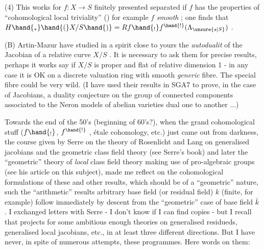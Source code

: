 
(4) This works  for $f : X \to S$ finitely presented separated if $f$ has the
 properties of ``cohomological local triviality''  () for
example $f$ \textit{smooth} ; one finds that $H\hand{_*}\hand{(}X/S\hand{)} = Rf\hand{_!}f^{\hand{!}}(\Lambda_{\unsure{s|S}})$ . \margin{\hand{$*\quad *\quad *$}}

(B) Artin-Mazur have studied in a spirit close to yours the \textit{autodualit} of
the Jacobian of a relative curve $X/S$ . It is necessary to ask them for
precise results, perhaps it works say if $X/S$ is proper and flat of relative
dimension 1 - in any case it is OK on a discrete valuation ring with smooth
\textit{generic} fibre. The special fibre could be very wild. (I have used their
results in SGA7 to prove, in the case of Jacobians, a duality conjecture on
the group of connected components associated to the Neron models of abelian
varieties dual one to another ...)

Towards the end  of the 50's (beginning of 60's?), when the
grand cohomological stuff ($f\hand{_!}$, $f^{\hand{!}}$ , étale cohomology, etc.)\deleted{,} just came out
from darkness, the course given by Serre on the theory of Rosenlicht and Lang
on generalised jacobians and the geometric class field theory (see Serre's book)
and later the ``geometric'' theory of \textit{local} class field theory making use of
pro-algebraic groups (see his article on this subject), made me reflect on
the cohomological formulations of these and other results, which should be
of a ``geometric'' nature, such   the ``arithmetic'' results   arbitrary
base field (or residual field) $k$ (finite, for example) follow immediately
by descent from the ``geometric'' case of base field $\bar{k}$ . I exchanged letters
with Serre - I don't know if I can find copies - but I recall that  
projects for some ambitious enough theories on generalised residueds,
generalised local jacobians, etc., in at least three different directions.
 But I have never, in spite of numerous attempts,  
  these programmes. Here   words on them:

